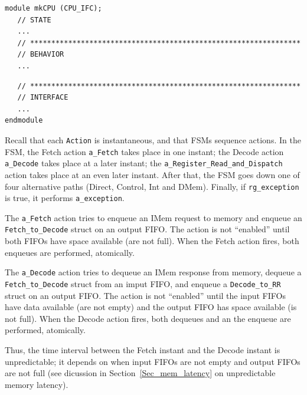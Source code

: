 {\footnotesize
\begin{Verbatim}
module mkCPU (CPU_IFC);
   // STATE
   ...
   // ****************************************************************
   // BEHAVIOR
   ...
\end{Verbatim}
}


{\footnotesize
\begin{Verbatim}
   // ****************************************************************
   // INTERFACE
   ...
endmodule
\end{Verbatim}
}

Recall that each \verb|Action| is instantaneous, and that FSMs
sequence actions.  In the FSM, the Fetch action \verb|a_Fetch| takes
place in one instant; the Decode action \verb|a_Decode| takes place at
a later instant; the \verb|a_Register_Read_and_Dispatch| action takes
place at an even later instant.  After that, the FSM goes down one of
four alternative paths (Direct, Control, Int and DMem).  Finally, if
\verb|rg_exception| is true, it performs \verb|a_exception|.

The \verb|a_Fetch| action tries to enqueue an IMem request to memory
and enqueue an \verb|Fetch_to_Decode| struct on an output FIFO.  The
action is not ``enabled'' until both FIFOs have space available (are
not full).  When the Fetch action fires, both enqueues are performed,
atomically.

The \verb|a_Decode| action tries to dequeue an IMem response from
memory, dequeue a \verb|Fetch_to_Decode| struct from an imput FIFO,
and enqueue a \verb|Decode_to_RR| struct on an output FIFO.  The
action is not ``enabled'' until the input FIFOs have data available
(are not empty) and the output FIFO has space available (is not full).
When the Decode action fires, both dequeues and an the enqueue are
performed, atomically.

Thus, the time interval between the Fetch instant and the Decode
instant is unpredictable; it depends on when input FIFOs are not empty
and output FIFOs are not full (see dicussion in
Section~\ref{Sec_mem_latency} on unpredictable memory latency).

\vspace{2ex}

